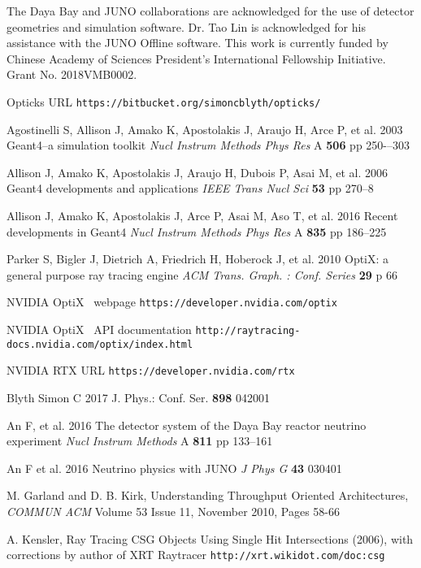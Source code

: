 \documentclass{webofc}
\begin{document}
The Daya Bay and JUNO collaborations are acknowledged for the use of detector 
geometries and simulation software. Dr. Tao Lin is acknowledged for his assistance with 
the JUNO Offline software. 
This work is currently funded by Chinese Academy of Sciences President’s International Fellowship Initiative. 
Grant No. 2018VMB0002.
%
%
%
\begin{thebibliography}{}

Opticks URL {\tt https://bitbucket.org/simoncblyth/opticks/}

Agostinelli S, Allison J, Amako K, Apostolakis J, Araujo H, Arce P, et al.
2003
Geant4--a simulation toolkit
{\it Nucl Instrum Methods Phys Res} A {\bf 506} pp 250-–303

Allison J, Amako K, Apostolakis J, Araujo H, Dubois P, Asai M, et al.
2006
Geant4 developments and applications
{\it IEEE Trans Nucl Sci} {\bf 53} pp 270--8

Allison J, Amako K, Apostolakis J, Arce P, Asai M, Aso T, et al.
2016
Recent developments in Geant4
{\it Nucl Instrum Methods Phys Res} A {\bf 835} pp 186--225

Parker S, Bigler J, Dietrich A, Friedrich H, Hoberock J, et al.
2010
OptiX: a general purpose ray tracing engine
{\it ACM Trans. Graph. : Conf. Series} {\bf 29} p 66

NVIDIA{\textregistered} OptiX\texttrademark~ webpage {\tt https://developer.nvidia.com/optix}

NVIDIA{\textregistered} OptiX\texttrademark~ API documentation {\tt http://raytracing-docs.nvidia.com/optix/index.html}

NVIDIA RTX URL {\tt https://developer.nvidia.com/rtx}

Blyth Simon C 2017 J. Phys.: Conf. Ser. {\bf 898} 042001

An F, et al.
2016
The detector system of the Daya Bay reactor neutrino experiment
{\it Nucl Instrum Methods} A {\bf 811} pp 133--161

An F et al.
2016
Neutrino physics with JUNO
{\it J Phys G} {\bf 43} 030401


M. Garland and D. B. Kirk, Understanding Throughput Oriented Architectures, 
{\it COMMUN ACM} Volume 53 Issue 11, November 2010, Pages 58-66  	


A. Kensler, Ray Tracing CSG Objects Using Single Hit Intersections (2006), 
with corrections by author of XRT Raytracer {\tt http://xrt.wikidot.com/doc:csg}



\end{thebibliography}
\end{document}
